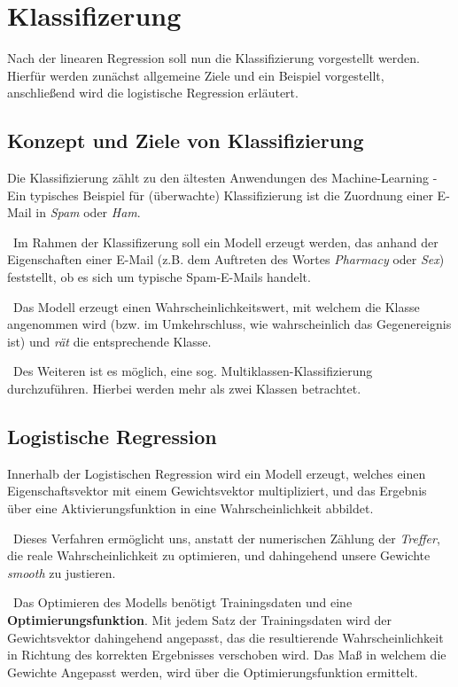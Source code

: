\section{Klassifizerung}
\label{sec:Klassifizierung}
Nach der linearen Regression soll nun die Klassifizierung vorgestellt werden. Hierfür werden zunächst allgemeine Ziele und ein Beispiel vorgestellt, anschließend wird die logistische Regression erläutert. 
 
\subsection{Konzept und Ziele von Klassifizierung}
Die Klassifizierung zählt zu den ältesten Anwendungen des Machine-Learning - Ein typisches Beispiel für (überwachte) Klassifizierung ist die Zuordnung einer E-Mail in \textit{Spam} oder \textit{Ham}.

~\newline Im Rahmen der Klassifizerung soll ein Modell erzeugt werden, das anhand der Eigenschaften einer E-Mail (z.B. dem Auftreten des Wortes \textit{Pharmacy} oder \textit{Sex}) feststellt, ob es sich um typische Spam-E-Mails handelt. 

~\newline Das Modell erzeugt einen Wahrscheinlichkeitswert, mit welchem die Klasse angenommen wird (bzw. im Umkehrschluss, wie wahrscheinlich das Gegenereignis ist) und \textit{rät} die entsprechende Klasse. 

~\newline Des Weiteren ist es möglich, eine sog. Multiklassen-Klassifizierung durchzuführen. Hierbei werden mehr als zwei Klassen betrachtet. 
\subsection{Logistische Regression}
\label{subsec:LogRegAcc}
Innerhalb der Logistischen Regression wird ein Modell erzeugt, welches einen Eigenschaftsvektor mit einem Gewichtsvektor multipliziert, und das Ergebnis über eine Aktivierungsfunktion in eine Wahrscheinlichkeit abbildet. 

~\newline Dieses Verfahren ermöglicht uns, anstatt der numerischen Zählung der \textit{Treffer}, die reale Wahrscheinlichkeit zu optimieren, und dahingehend unsere Gewichte \textit{smooth} zu justieren. 

~\newline Das Optimieren des Modells benötigt Trainingsdaten und eine \textbf{Optimierungsfunktion}. Mit jedem Satz der Trainingsdaten wird der Gewichtsvektor dahingehend angepasst, das die resultierende Wahrscheinlichkeit in Richtung des korrekten Ergebnisses verschoben wird. Das Maß in welchem die Gewichte Angepasst werden, wird über die Optimierungsfunktion ermittelt. 


